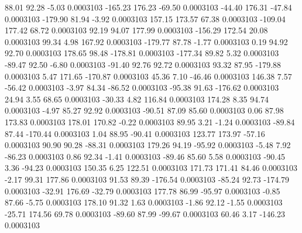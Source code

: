        88.01       92.28       -5.03     0.0003103
     -165.23      176.23      -69.50     0.0003103
      -44.40      176.31      -47.84     0.0003103
     -179.90       81.94       -3.92     0.0003103
      157.15      173.57       67.38     0.0003103
     -109.04      177.42       68.72     0.0003103
       92.19       94.07      177.99     0.0003103
     -156.29      172.54       20.08     0.0003103
       99.34        4.98      167.92     0.0003103
     -179.77       87.78       -1.77     0.0003103
        0.19       94.92       92.70     0.0003103
      178.65       98.48     -178.81     0.0003103
     -177.34       89.82        5.32     0.0003103
      -89.47       92.50       -6.80     0.0003103
      -91.40       92.76       92.72     0.0003103
       93.32       87.95     -179.88     0.0003103
        5.47      171.65     -170.87     0.0003103
       45.36        7.10      -46.46     0.0003103
      146.38        7.57      -56.42     0.0003103
       -3.97       84.34      -86.52     0.0003103
      -95.38       91.63     -176.62     0.0003103
       24.94        3.55       68.65     0.0003103
      -30.33        4.82      116.84     0.0003103
      174.28        8.35       94.74     0.0003103
       -4.97       85.27       92.92     0.0003103
      -90.51       87.09       85.60     0.0003103
        0.06       87.98      173.83     0.0003103
      178.01      170.82       -0.22     0.0003103
       89.95        3.21       -1.24     0.0003103
      -89.84       87.44     -170.44     0.0003103
        1.04       88.95      -90.41     0.0003103
      123.77      173.97      -57.16     0.0003103
       90.90       90.28      -88.31     0.0003103
      179.26       94.19      -95.92     0.0003103
       -5.48        7.92      -86.23     0.0003103
        0.86       92.34       -1.41     0.0003103
      -89.46       85.60        5.58     0.0003103
      -90.45        3.36      -94.23     0.0003103
      150.35        6.25      122.51     0.0003103
      171.73      171.41       84.46     0.0003103
       -2.17       99.31      177.86     0.0003103
       91.53       89.39     -176.54     0.0003103
      -85.24       92.73     -174.79     0.0003103
      -32.91      176.69      -32.79     0.0003103
      177.78       86.99      -95.97     0.0003103
       -0.85       87.66       -5.75     0.0003103
      178.10       91.32        1.63     0.0003103
       -1.86       92.12       -1.55     0.0003103
      -25.71      174.56       69.78     0.0003103
      -89.60       87.99      -99.67     0.0003103
       60.46        3.17     -146.23     0.0003103
